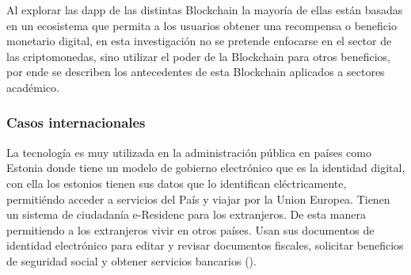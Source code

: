 Al explorar las \gls{dapp} de las distintas  Blockchain la mayoría de ellas
están basadas en un ecosistema que permita a los usuarios obtener una recompensa o beneficio 
monetario digital, en esta investigación no se pretende enfocarse en el sector de las criptomonedas,
sino utilizar el poder de la  Blockchain para otros beneficios, por ende se describen los antecedentes
de esta  Blockchain aplicados a sectores académico.






\subsubsection{Casos internacionales}

La tecnología es muy utilizada en la administración pública en países como Estonia donde
tiene un modelo de gobierno electrónico que es la identidad digital, con ella los estonios tienen sus datos
que lo identifican eléctricamente, permitiéndo acceder a servicios del País y viajar por la Union Europea.   
Tienen un sistema de ciudadanía e-Residenc para los extranjeros. De esta manera permitiendo a los
extranjeros vivir en otros países. Usan sus documentos de identidad electrónico para editar y revisar 
documentos fiscales, solicitar beneficios de seguridad social y obtener servicios bancarios (\cite[]{brys_cadena_2019}).

